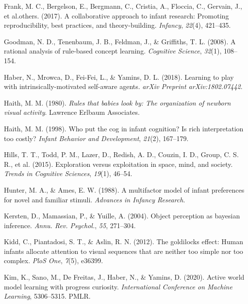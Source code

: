 \documentclass[
  man,floatsintext]{apa6}
\newlength{\cslhangindent}
\newlength{\cslentryspacingunit} %
\newenvironment{CSLReferences}[2] %
 {%
  \setlength{\parindent}{0pt}
  \ifodd #1
  \let\oldpar\par
  \def\par{\hangindent=\cslhangindent\oldpar}
  \fi
  \setlength{\parskip}{#2\cslentryspacingunit}
 }%
 {}
\begin{document}
\begin{CSLReferences}{1}{0}
\leavevmode{}%
Frank, M. C., Bergelson, E., Bergmann, C., Cristia, A., Floccia, C., Gervain, J., et al.others. (2017). A collaborative approach to infant research: Promoting reproducibility, best practices, and theory-building. \emph{Infancy}, \emph{22}(4), 421--435.

\leavevmode{}%
Goodman, N. D., Tenenbaum, J. B., Feldman, J., \& Griffiths, T. L. (2008). A rational analysis of rule-based concept learning. \emph{Cognitive Science}, \emph{32}(1), 108--154.

\leavevmode{}%
Haber, N., Mrowca, D., Fei-Fei, L., \& Yamins, D. L. (2018). Learning to play with intrinsically-motivated self-aware agents. \emph{arXiv Preprint arXiv:1802.07442}.

\leavevmode{}%
Haith, M. M. (1980). \emph{Rules that babies look by: The organization of newborn visual activity}. Lawrence Erlbaum Associates.

\leavevmode{}%
Haith, M. M. (1998). Who put the cog in infant cognition? Is rich interpretation too costly? \emph{Infant Behavior and Development}, \emph{21}(2), 167--179.

\leavevmode{}%
Hills, T. T., Todd, P. M., Lazer, D., Redish, A. D., Couzin, I. D., Group, C. S. R., et al. (2015). Exploration versus exploitation in space, mind, and society. \emph{Trends in Cognitive Sciences}, \emph{19}(1), 46--54.

\leavevmode{}%
Hunter, M. A., \& Ames, E. W. (1988). A multifactor model of infant preferences for novel and familiar stimuli. \emph{Advances in Infancy Research}.

\leavevmode{}%
Kersten, D., Mamassian, P., \& Yuille, A. (2004). Object perception as bayesian inference. \emph{Annu. Rev. Psychol.}, \emph{55}, 271--304.

\leavevmode{}%
Kidd, C., Piantadosi, S. T., \& Aslin, R. N. (2012). The goldilocks effect: Human infants allocate attention to visual sequences that are neither too simple nor too complex. \emph{PloS One}, \emph{7}(5), e36399.

\leavevmode{}%
Kim, K., Sano, M., De Freitas, J., Haber, N., \& Yamins, D. (2020). Active world model learning with progress curiosity. \emph{International Conference on Machine Learning}, 5306--5315. PMLR.


\end{CSLReferences}
\end{document}
